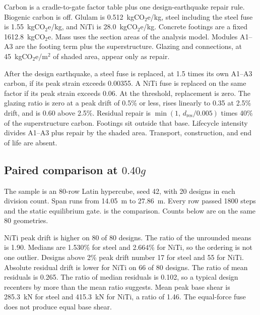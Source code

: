 \documentclass[10pt,a4paper]{article}
\begin{document}
Carbon is a cradle-to-gate factor table plus one design-earthquake repair rule. Biogenic carbon is off. Glulam is 0.512~kgCO$_2$e/kg, steel including the steel fuse is 1.55~kgCO$_2$e/kg, and NiTi is 28.0~kgCO$_2$e/kg. Concrete footings are a fixed 1612.8~kgCO$_2$e. Mass uses the section areas of the analysis model. Modules A1--A3 are the footing term plus the superstructure. Glazing and connections, at 45~kgCO$_2$e/m$^2$ of shaded area, appear only as repair.

After the design earthquake, a steel fuse is replaced, at 1.5 times its own A1--A3 carbon, if its peak strain exceeds 0.00355. A NiTi fuse is replaced on the same factor if its peak strain exceeds 0.06. At the threshold, replacement is zero. The glazing ratio is zero at a peak drift of 0.5\% or less, rises linearly to 0.35 at 2.5\% drift, and is 0.60 above 2.5\%. Residual repair is $\min(1,\,d_{\mathrm{res}}/0.005)$ times 40\% of the superstructure carbon. Footings sit outside that base. Lifecycle intensity divides A1--A3 plus repair by the shaded area. Transport, construction, and end of life are absent.

\subsection{Paired comparison at \texorpdfstring{$0.40g$}{0.40 g}}

The sample is an 80-row Latin hypercube, seed 42, with 20 designs in each division count. Span runs from 14.05~m to 27.86~m. Every row passed 1800 steps and the static equilibrium gate.  is the comparison. Counts below are on the same 80 geometries.

\begin{table}[t]
  \centering
  \small
  \setlength{\tabcolsep}{6pt}
  \caption{Means over 80 paired canopies, ground-motion seed 101, peak acceleration $0.40g$. Drift quantities are in percent. False-safe rates are fractions of the 80 designs of that fuse. The $R^2$ row is grouped cross-validation for peak drift.}
  \label{tab:compare}
  
\end{table}

NiTi peak drift is higher on 80 of 80 designs. The ratio of the unrounded means is 1.90. Medians are 1.530\% for steel and 2.664\% for NiTi, so the ordering is not one outlier. Designs above 2\% peak drift number 17 for steel and 55 for NiTi. Absolute residual drift is lower for NiTi on 66 of 80 designs. The ratio of mean residuals is 0.265. The ratio of median residuals is 0.102, so a typical design recenters by more than the mean ratio suggests. Mean peak base shear is 285.3~kN for steel and 415.3~kN for NiTi, a ratio of 1.46. The equal-force fuse does not produce equal base shear.
\end{document}
